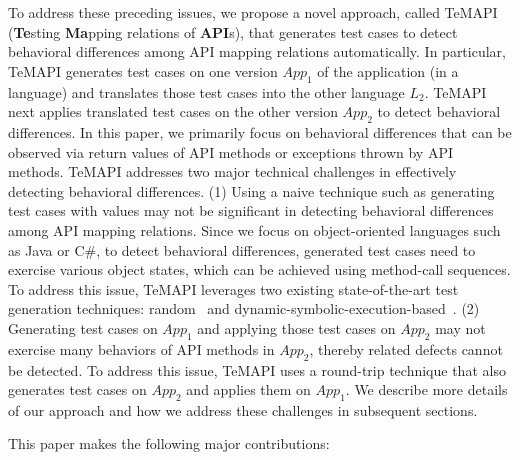 %

To address these preceding issues, we propose a novel approach, called TeMAPI (\textbf{Te}sting \textbf{Ma}pping relations of \textbf{API}s), that generates test cases to detect behavioral differences among API mapping relations automatically. In particular, TeMAPI generates test cases on one version $App_1$ of the application (in a language) and translates those test cases into the other language $L_2$. TeMAPI next applies translated test cases on the other version $App_2$ to detect behavioral differences. In this paper, we primarily focus on behavioral differences that can be observed via return values of API methods or exceptions thrown by API methods. TeMAPI addresses two major technical challenges in effectively detecting behavioral differences. (1) Using a naive technique such as generating test cases with  values may not be significant in detecting behavioral differences among API mapping relations. Since we focus on object-oriented languages such as Java or C\#, to detect behavioral differences, generated test cases need to exercise various object states, which can be achieved using method-call sequences. To address this issue, TeMAPI leverages two existing state-of-the-art test generation techniques: random~\cite{pacheco2007feedback} and dynamic-symbolic-execution-based~\cite{koushik:cute, godefroid:dart, tillmann2008pex}. (2) Generating test cases on $App_1$ and applying those test cases on $App_2$ may not exercise many behaviors of API methods in $App_2$, thereby related defects cannot be detected. To address this issue, TeMAPI uses a round-trip technique that also generates test cases on $App_2$ and applies them on $App_1$. We describe more details of our approach and how we address these challenges in subsequent sections.

This paper makes the following major contributions:

